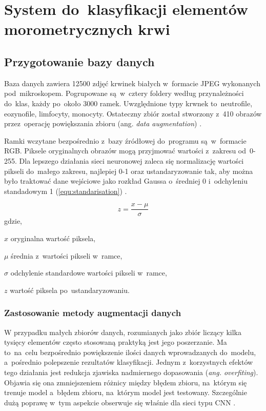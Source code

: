 \chapter{System do~klasyfikacji elementów morometrycznych krwi}
\label{cha:system_do_klasyfikacji_elementow_morfologicznych}

\section{Przygotowanie bazy danych}
\label{przygotowanie_danych}

Baza danych zawiera 12500 zdjęć krwinek białych w~formacie JPEG wykonanych pod~mikroskopem. Pogrupowane są~w~cztery foldery według przynależności do~klas, każdy po~około 3000 ramek. Uwzględnione typy krwnek to~neutrofile, eozynofile, limfocyty, monocyty. Ostateczny zbiór został stworzony z~410 obrazów przez~operację powiększania zbioru (ang. \textit{data augmentation}) \cite{kaggle_database}.

{\parindent0pt %
Ramki wczytane bezpośrednio z~bazy źródłowej do~programu są~w~formacie RGB. Piksele oryginalnych obrazów mogą przyjmować wartości z~zakresu od~0-255. Dla lepszego działania sieci neuronowej zaleca się normalizację wartości pikseli do~małego zakresu, najlepiej 0-1 oraz ustandaryzowanie tak, aby można było traktować dane wejściowe jako rozkład Gaussa o~średniej 0 i~odchyleniu standadowym 1 (\ref{equ:standarisation}) \cite{standarisation}.

\begin{equation}
z =  \frac{x - \mu}{\sigma} 
\label{equ:standarisation}
\end{equation}
gdzie,
\begin{eqwhere}[2cm]
	\item[$x$] oryginalna wartość piksela,
	\item[$\mu$] średnia z~wartości pikseli w~ramce,
	\item[$\sigma$] odchylenie standardowe wartości pikseli w~ramce,
	\item[$z$] wartość piksela po~ustandaryzowaniu.
\end{eqwhere}
}

\subsection{Zastosowanie metody augmentacji danych}
W przypadku małych zbiorów danych, rozumianych jako zbiór liczący kilka tysięcy elementów często stosowaną praktyką jest jego poszerzanie. Ma to~na~celu bezpośrednio powiększenie ilości danych wprowadzanych do~modelu, a~pośrednio polepszenie rezultatów klasyfikacji. Jednym z~korzystnych efektów tego działania jest redukcja zjawiska nadmiernego dopasowania (\textit{ang. overfiting}). Objawia się ona zmniejszeniem różnicy między błędem zbioru, na~którym się trenuje model a~błędem zbioru, na~którym model jest testowany. Szczególnie dużą poprawę w~tym aspekcie obserwuje się właśnie dla sieci typu CNN \cite{Wong2016UnderstandingDA}.

